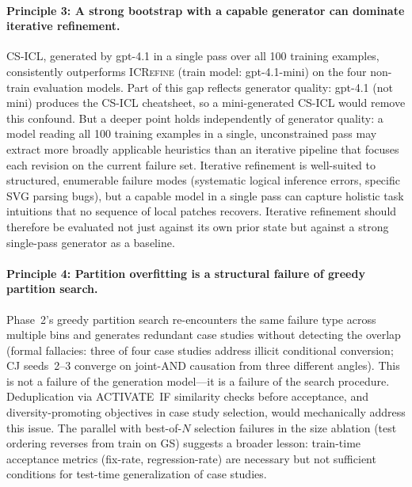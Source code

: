 \paragraph{Principle 3: A strong bootstrap with a capable generator can dominate iterative refinement.}
CS-ICL, generated by gpt-4.1 in a single pass over all 100 training examples, consistently
outperforms \textsc{ICRefine} (train model: gpt-4.1-mini) on the four non-train evaluation
models.
Part of this gap reflects generator quality: gpt-4.1 (not mini) produces the CS-ICL
cheatsheet, so a mini-generated CS-ICL would remove this confound.
But a deeper point holds independently of generator quality: a model reading all 100
training examples in a single, unconstrained pass may extract more broadly applicable
heuristics than an iterative pipeline that focuses each revision on the current failure set.
Iterative refinement is well-suited to structured, enumerable failure modes (systematic
logical inference errors, specific SVG parsing bugs), but a capable model in a single pass
can capture holistic task intuitions that no sequence of local patches recovers.
Iterative refinement should therefore be evaluated not just against its own prior state but
against a strong single-pass generator as a baseline.

\paragraph{Principle 4: Partition overfitting is a structural failure of greedy partition search.}
Phase~2's greedy partition search re-encounters the same failure type across multiple bins
and generates redundant case studies without detecting the overlap (formal fallacies: three
of four case studies address illicit conditional conversion; CJ seeds~2--3 converge on
joint-AND causation from three different angles).
This is not a failure of the generation model---it is a failure of the search procedure.
Deduplication via ACTIVATE~IF similarity checks before acceptance, and diversity-promoting
objectives in case study selection, would mechanically address this issue.
The parallel with best-of-$N$ selection failures in the size ablation (test ordering
reverses from train on GS) suggests a broader lesson: train-time acceptance metrics
(fix-rate, regression-rate) are necessary but not sufficient conditions for test-time
generalization of case studies.

